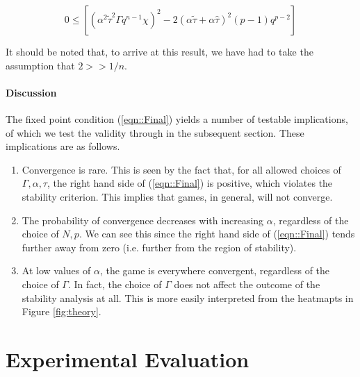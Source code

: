\documentclass[sigconf,anonymous]{aamas}
\newcommand{\ttau}{\tilde{\tau}}
\newcommand{\htau}{\hat{\tau}}
\begin{document}
\begin{equation}
    \label{eqn::Final}
    0 \leq \left [(\alpha^2 \ttau^2 \Gamma q^{n-1} \chi)^{2} - 2 (\alpha \ttau + \alpha \htau)^2 (p-1)q^{p-2} \right ]
\end{equation}

It should be noted that, to arrive at this result, we have had to take the assumption that $2 >> 1/n$. 


\paragraph{Discussion}
The fixed point condition (\ref{eqn::Final}) yields a number of testable implications, of which we test the validity through in the subsequent section. These implications are as follows.

\begin{enumerate}
    \item Convergence is rare. This is seen by the fact that, for all allowed choices of $\Gamma, \alpha, \tau$, the right hand side of (\ref{eqn::Final}) is positive, which violates the stability criterion. This implies that games, in general, will not converge.
    \item The probability of convergence decreases with increasing $\alpha$, regardless of the choice of $N, p$. We can see this since the right hand side of (\ref{eqn::Final}) tends further away from zero (i.e. further from the region of stability).
    \item At low values of $\alpha$, the game is everywhere convergent, regardless of the choice of $\Gamma$. In fact, the choice of $\Gamma$ does not affect the outcome of the stability analysis at all. This is more easily interpreted from the heatmapts in Figure \ref{fig:theory}.
\end{enumerate}


\section{Experimental Evaluation} \label{sec:exev}
\end{document}
